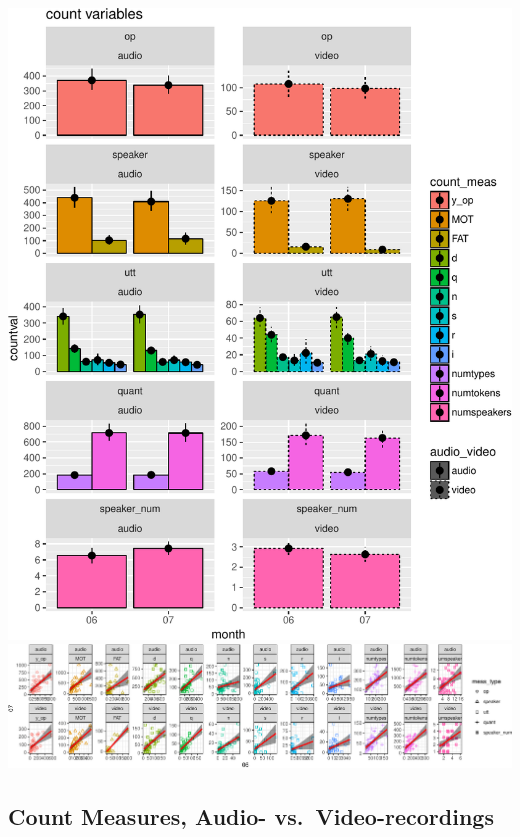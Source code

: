 \documentclass[floatsintext,man]{apa6}
\theoremstyle{definition}
\theoremstyle{definition}
\theoremstyle{definition}
\theoremstyle{remark}
\begin{document}
\includegraphics{sixseven_papaja_files/figure-latex/gr_derived_counts_67_diff-1.pdf}
\includegraphics{sixseven_papaja_files/figure-latex/gr_derived_counts_67_corr-1.pdf}

\subsection{Count Measures, Audio-
vs.~Video-recordings}\label{count-measures-audio--vs.video-recordings}
\end{document}
